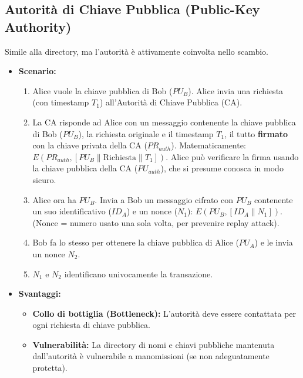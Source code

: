 \subsection{Autorità di Chiave Pubblica (Public-Key Authority)}
Simile alla directory, ma l'autorità è attivamente coinvolta nello scambio.
\begin{itemize}
    \item \textbf{Scenario:}
        \begin{enumerate}
            \item Alice vuole la chiave pubblica di Bob ($PU_B$). Alice invia una richiesta (con timestamp $T_1$) all'Autorità di Chiave Pubblica (CA).
            \item La CA risponde ad Alice con un messaggio contenente la chiave pubblica di Bob ($PU_B$), la richiesta originale e il timestamp $T_1$, il tutto \textbf{firmato} con la chiave privata della CA ($PR_{auth}$). Matematicamente: $E(PR_{auth}, [PU_B \parallel \text{Richiesta} \parallel T_1])$. Alice può verificare la firma usando la chiave pubblica della CA ($PU_{auth}$), che si presume conosca in modo sicuro.
            \item Alice ora ha $PU_B$. Invia a Bob un messaggio cifrato con $PU_B$ contenente un suo identificativo ($ID_A$) e un nonce ($N_1$): $E(PU_B, [ID_A \parallel N_1])$. (Nonce = numero usato una sola volta, per prevenire replay attack).
            \item Bob fa lo stesso per ottenere la chiave pubblica di Alice ($PU_A$) e le invia un nonce $N_2$.
            \item $N_1$ e $N_2$ identificano univocamente la transazione.
        \end{enumerate}
    \item \textbf{Svantaggi:}
        \begin{itemize}
            \item \textbf{Collo di bottiglia (Bottleneck):} L'autorità deve essere contattata per ogni richiesta di chiave pubblica.
            \item \textbf{Vulnerabilità:} La directory di nomi e chiavi pubbliche mantenuta dall'autorità è vulnerabile a manomissioni (se non adeguatamente protetta).
        \end{itemize}
\end{itemize}

